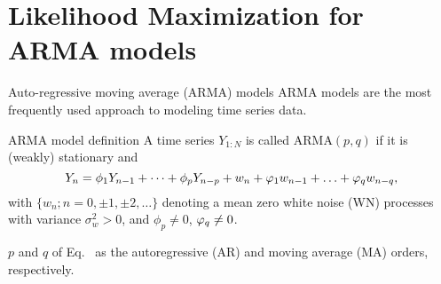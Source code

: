 \documentclass[aspectratio=169]{beamer}\usepackage[]{graphicx}\usepackage[]{xcolor}
\begin{document}
\section{Likelihood Maximization for ARMA models}

\begin{frame}{Auto-regressive moving average ($\mathrm{ARMA}$) models}
  $\mathrm{ARMA}$ models are the most frequently used approach to modeling time series data.
  
  \begin{block}{ARMA model definition}
    A time series $Y_{1:N}$ is called $\mathrm{ARMA}(p, q)$ if it is (weakly) stationary and
    \begin{equation}
    Y_n = \phi_1Y_{n - 1} + \cdots + \phi_pY_{n - p} + w_n + \varphi_1w_{n-1} + \ldots + \varphi_qw_{n - q},\label{eq:arma}
    \end{equation}
    with $\{w_n; n = 0, \pm1, \pm2, \ldots\}$ denoting a mean zero white noise (WN) processes with variance $\sigma_w^2 > 0$, and $\phi_p \neq 0$, $\varphi_q \neq 0$.
  \end{block}
  
  $p$ and $q$ of Eq.~ as the autoregressive (AR) and moving average (MA) orders, respectively.
\end{frame}
\end{document}
